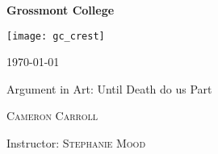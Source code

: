\documentclass[12pt,letterpaper]{article}
\begin{document}
\thispagestyle{empty}
\begin{spacing}{1.5}
\begin{center}
{\Large \bfseries
Grossmont College}

\vspace*{10mm}

\texttt{[image: gc\_crest]}

\vspace*{15mm}
{\large \today
}

\vspace*{10mm}



\LARGE Argument in Art: Until Death do us Part

\vspace*{20mm}

{\large \textsc{ Cameron Carroll}
}

\vspace*{20mm}

\small{Instructor: \textsc{Stephanie Mood}}

\end{center}
\end{spacing}

\newpage
\setcounter{page}{1}
\end{document}
